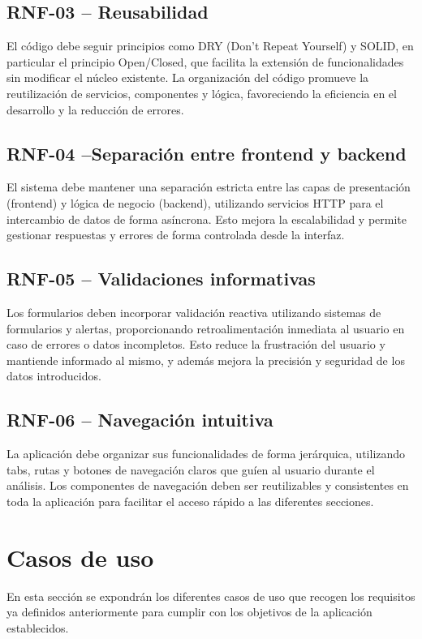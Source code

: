 \subsection*{RNF-03 – Reusabilidad}
El código debe seguir principios como DRY (Don’t Repeat Yourself) y SOLID, en particular el principio Open/Closed, que facilita la extensión de funcionalidades sin modificar el núcleo existente. La organización del código promueve la reutilización de servicios, componentes y lógica, favoreciendo la eficiencia en el desarrollo y la reducción de errores.

\subsection*{RNF-04 –Separación entre frontend y backend}
El sistema debe mantener una separación estricta entre las capas de presentación (frontend) y lógica de negocio (backend), utilizando servicios HTTP para el intercambio de datos de forma asíncrona. Esto mejora la escalabilidad y permite gestionar respuestas y errores de forma controlada desde la interfaz.

\subsection*{RNF-05 – Validaciones informativas}
Los formularios deben incorporar validación reactiva utilizando sistemas de formularios y alertas, proporcionando retroalimentación inmediata al usuario en caso de errores o datos incompletos. Esto reduce la frustración del usuario y mantiende informado al mismo, y además mejora la precisión y seguridad de los datos introducidos.

\subsection*{RNF-06 – Navegación intuitiva}
La aplicación debe organizar sus funcionalidades de forma jerárquica, utilizando tabs, rutas y botones de navegación claros que guíen al usuario durante el análisis. Los componentes de navegación deben ser reutilizables y consistentes en toda la aplicación para facilitar el acceso rápido a las diferentes secciones.

\section{Casos de uso}

En esta sección se expondrán los diferentes casos de uso que recogen los requisitos ya definidos anteriormente para cumplir con los objetivos de la aplicación establecidos.

